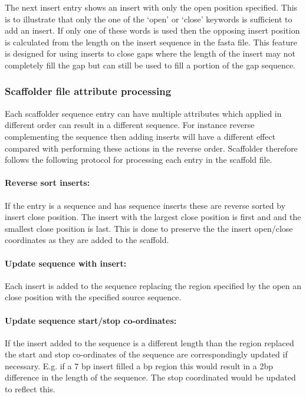 \documentclass[10pt]{bmc_article}
\newenvironment{bmcformat}{\begin{raggedright}\baselineskip20pt\sloppy\setboolean{publ}{false}}{\end{raggedright}\baselineskip20pt\sloppy}
\begin{document}
\begin{bmcformat}
The next insert entry shows an insert with only the open position specified.
This is to illustrate that only the one of the `open' or `close' keywords is
sufficient to add an insert. If only one of these words is used then the
opposing insert position is calculated from the length on the insert sequence
in the fasta file. This feature is designed for using inserts to close gaps
where the length of the insert may not completely fill the gap but can still be
used to fill a portion of the gap sequence. \pb

\subsubsection*{Scaffolder file attribute processing} %

Each scaffolder sequence entry can have multiple attributes which applied in
different order can result in a different sequence. For instance reverse
complementing the sequence then adding inserts will have a different effect
compared with performing these actions in the reverse order. Scaffolder
therefore follows the following protocol for processing each entry in the
scaffold file. \pb

\paragraph{Reverse sort inserts:} If the entry is a sequence and has sequence
inserts these are reverse sorted by insert close position. The insert with the
largest close position is first and and the smallest close position is last.
This is done to preserve the the insert open/close coordinates as they are
added to the scaffold. \pb

\paragraph{Update sequence with insert:} Each insert is added to the sequence
replacing the region specified by the open an close position with the specified
source sequence.\pb

\paragraph{Update sequence start/stop co-ordinates:} If the insert added to the
sequence is a different length than the region replaced the start and stop
co-ordinates of the sequence are correspondingly updated if necessary. E.g. if
a 7 bp insert filled a bp region this would result in a 2bp difference in the
length of the sequence. The stop coordinated would be updated to reflect this.
\pb


\end{bmcformat}
\end{document}
